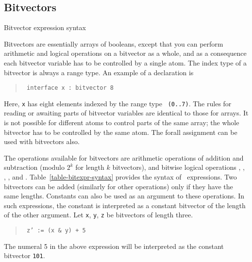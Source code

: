 \subsection{Bitvectors}
\label{sec-bitvector}

\begin{table}
\caption{Bitvector expression syntax}  
\label{table-bitexpr-syntax}
\end{table}

Bitvectors are essentially arrays of booleans, except that you can
perform arithmetic and logical operations on a bitvector as a whole,
and  as a consequence each bitvector variable has to be controlled
by a single atom. The index type of a bitvector is always a range
type. An example of a declaration is 

\begin{quote} \tt
interface x : bitvector 8
\end{quote}

Here, {\tt x} has eight elements indexed by the range type {\tt
(0..7)}. The rules for reading or awaiting parts of bitvector
variables are identical to those for arrays. It is not possible for
different atoms to control parts of the same array; the whole
bitvector has to be controlled by the same atom. The forall assignment
can be used with bitvectors also. 

The operations available for bitvectors are arithmetic operations of addition and subtraction
(modulo $2^k$ for length $k$ bitvectors), and bitwise logical
operations \AND, \OR, \NOT, \IMPLY, and \EQUIV.
Table~\ref{table-bitexpr-syntax} provides the syntax of \bitexpr\ expressions.
Two bitvectors can be added (similarly
for other operations) only if they have the same lengths. Constants
can also be used as an argument to these operations. In such
expressions, the constant is interpreted as a constant bitvector of
the length of the other argument. Let {\tt x}, {\tt y}, {\tt z} be bitvectors of
length three.

\begin{quote} \tt
z' := (x \& y) + 5
\end{quote}

The numeral 5 in the above expression will be interpreted as the
constant bitvector {\tt 101}.









